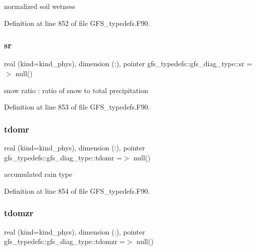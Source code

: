 normalized soil wetness 



Definition at line 852 of file G\+F\+S\+\_\+typedefs.\+F90.

\mbox{\label{structgfs__typedefs_1_1gfs__diag__type_a3d0803ac451b5909e9d9ce1d33c405d8}} 
\subsubsection{sr}
{\footnotesize\ttfamily real (kind=kind\+\_\+phys), dimension     (\+:), pointer gfs\+\_\+typedefs\+::gfs\+\_\+diag\+\_\+type\+::sr =$>$ null()}



snow ratio \+: ratio of snow to total precipitation 



Definition at line 853 of file G\+F\+S\+\_\+typedefs.\+F90.

\mbox{\label{structgfs__typedefs_1_1gfs__diag__type_a47b9e7e4535c69e5155ff6779688adae}} 
\subsubsection{tdomr}
{\footnotesize\ttfamily real (kind=kind\+\_\+phys), dimension  (\+:), pointer gfs\+\_\+typedefs\+::gfs\+\_\+diag\+\_\+type\+::tdomr =$>$ null()}



accumulated rain type 



Definition at line 854 of file G\+F\+S\+\_\+typedefs.\+F90.

\mbox{\label{structgfs__typedefs_1_1gfs__diag__type_a8f19c95f270295be9bea7c531a1b3344}} 
\subsubsection{tdomzr}
{\footnotesize\ttfamily real (kind=kind\+\_\+phys), dimension (\+:), pointer gfs\+\_\+typedefs\+::gfs\+\_\+diag\+\_\+type\+::tdomzr =$>$ null()}



